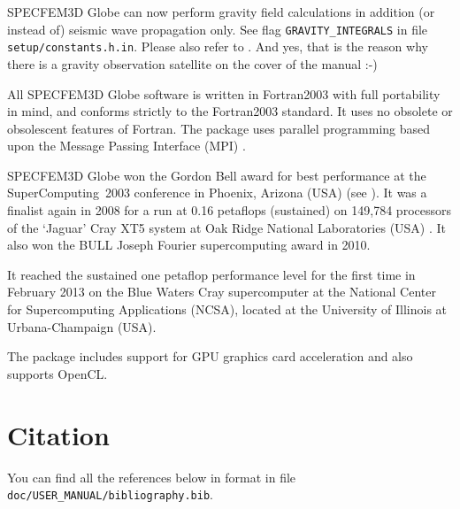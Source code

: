 SPECFEM3D Globe can now perform gravity field calculations in addition (or instead of) seismic wave propagation only.
See flag \texttt{GRAVITY\_INTEGRALS} in file \texttt{setup/constants.h.in}. Please also refer to \citet{Martin2017}.
And yes, that is the reason why there is a gravity observation satellite on the cover of the manual :-)\newline


All SPECFEM3D Globe software is written in Fortran2003 with full portability
in mind, and conforms strictly to the Fortran2003 standard. It uses
no obsolete or obsolescent features of Fortran. The package uses
parallel programming based upon the Message Passing Interface (MPI)
\citep{GrLuSk94,Pac97}.\newline


SPECFEM3D Globe won the Gordon Bell award for best performance at the SuperComputing~2003
conference in Phoenix, Arizona (USA) (see \cite{KoTsChTr03}).
It was a finalist again in 2008 for a run at 0.16 petaflops (sustained) on 149,784 processors of the `Jaguar' Cray XT5 system at Oak Ridge National Laboratories (USA) \citep{CaKoLaTiMiLeSnTr08}.
It also won the BULL Joseph Fourier supercomputing award in 2010.\newline


It reached the sustained one petaflop performance level for the first time in February 2013
on the Blue Waters Cray supercomputer at the National Center for Supercomputing Applications (NCSA), located at the University of Illinois at Urbana-Champaign (USA).\newline


The package includes support for GPU graphics card acceleration \citep{Kom11,MiKo10,KoMiEr09,KoErGoMi10} and also supports OpenCL.\newline



\section{Citation}

You can find all the references below in \BibTeX format in file \texttt{doc/USER\_MANUAL/bibliography.bib}.\newline


